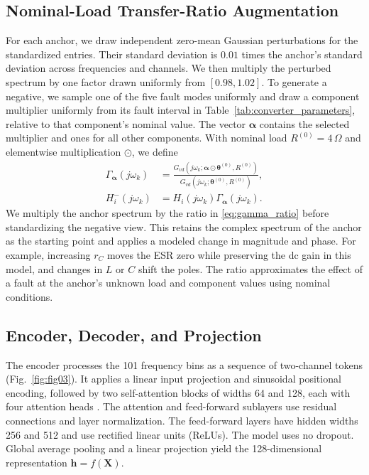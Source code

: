 \documentclass[journal]{IEEEtran}
\begin{document}
\subsection{Nominal-Load Transfer-Ratio Augmentation}\label{sec:4_2}

For each anchor, we draw independent zero-mean Gaussian perturbations for the standardized entries. Their standard deviation is $0.01$ times the anchor's standard deviation across frequencies and channels. We then multiply the perturbed spectrum by one factor drawn uniformly from $[0.98,1.02]$. To generate a negative, we sample one of the five fault modes uniformly and draw a component multiplier uniformly from its fault interval in Table~\ref{tab:converter_parameters}, relative to that component's nominal value. The vector $\boldsymbol{\alpha}$ contains the selected multiplier and ones for all other components. With nominal load $R^{(0)}=4\,\Omega$ and elementwise multiplication $\odot$, we define
\begin{align}
\Gamma_{\boldsymbol{\alpha}}(j\omega_k) &=
\frac{G_{vd}(j\omega_k;\boldsymbol{\alpha}\odot\boldsymbol{\theta}^{(0)},R^{(0)})}
     {G_{vd}(j\omega_k;\boldsymbol{\theta}^{(0)},R^{(0)})},
\label{eq:gamma_ratio}\\
H_i^-(j\omega_k) &= H_i(j\omega_k)\Gamma_{\boldsymbol{\alpha}}(j\omega_k).
\end{align}
We multiply the anchor spectrum by the ratio in \eqref{eq:gamma_ratio} before standardizing the negative view. This retains the complex spectrum of the anchor as the starting point and applies a modeled change in magnitude and phase. For example, increasing $r_C$ moves the ESR zero while preserving the dc gain in this model, and changes in $L$ or $C$ shift the poles. The ratio approximates the effect of a fault at the anchor's unknown load and component values using nominal conditions.

\subsection{Encoder, Decoder, and Projection}\label{sec:4_3}

The encoder processes the 101 frequency bins as a sequence of two-channel tokens (Fig.~\ref{fig:fig03}). It applies a linear input projection and sinusoidal positional encoding, followed by two self-attention blocks of widths 64 and 128, each with four attention heads \cite{vaswani2017attention}. The attention and feed-forward sublayers use residual connections and layer normalization. The feed-forward layers have hidden widths 256 and 512 and use rectified linear units (ReLUs). The model uses no dropout. Global average pooling and a linear projection yield the 128-dimensional representation $\mathbf h=f(\mathbf X)$.
\end{document}
